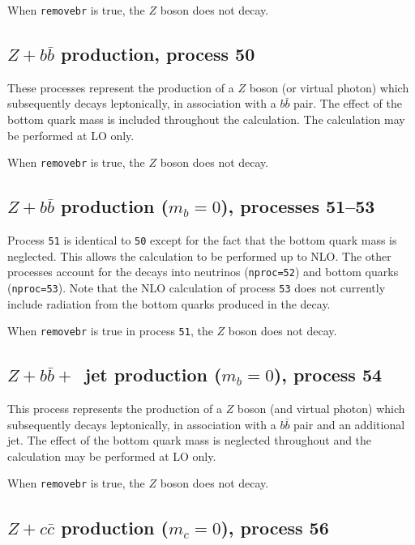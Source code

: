 \documentclass[12pt]{article}
\begin{document}
When {\tt removebr} is true, the $Z$ boson does not decay.

\subsection{$Z+b{\bar b}$ production, process 50}
\label{subsec:zbb}

These processes represent the production of a $Z$ boson (or virtual photon)
which subsequently decays leptonically, in association
with a $b{\bar b}$ pair. The effect of
the bottom quark mass is included throughout the calculation.  
The calculation may be performed at LO only.

When {\tt removebr} is true, the $Z$ boson does not decay.

\subsection{$Z+b{\bar b}$ production ($m_b=0$), processes 51--53}
\label{subsec:zbbmassless}

Process {\tt 51} is identical to {\tt 50} except for the fact
that the bottom quark mass is neglected. This allows the calculation to be
performed up to NLO. The other processes account for the decays into
neutrinos ({\tt nproc=52}) and bottom quarks ({\tt nproc=53}). Note that
the NLO calculation of process {\tt 53} does not currently 
include radiation from the
bottom quarks produced in the decay.

When {\tt removebr} is true in process {\tt 51}, the $Z$ boson does not decay.

\subsection{$Z+b{\bar b}+$~jet production ($m_b=0$), process 54}
\label{subsec:zbbjetmassless}

This process represents the production of a $Z$ boson (and virtual photon)
which subsequently decays leptonically, in association
with a $b{\bar b}$ pair and an additional jet.
The effect of the bottom quark mass is neglected throughout
and the calculation may be performed at LO only.

When {\tt removebr} is true, the $Z$ boson does not decay.

\subsection{$Z+c{\bar c}$ production ($m_c=0$), process 56}
\label{subsec:zccmassless}
\end{document}
